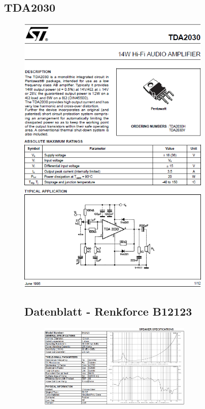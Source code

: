 \subsection{TDA2030}\label{subsec:8.3.5}
\begin{figure} [H]	
	\centering
	\includegraphics[width=0.82\textwidth]{form/tda2030first.PNG}
\end{figure}

\begin{figure}
	\subsection{Datenblatt - Renkforce B12123}\label{sec:8.7}
	\begin{figure} [H]
		\centering
		\includegraphics[width=0.8\textwidth]{img/LSMessung/TT/Renkforce-Datasheet1.png}
	\end{figure}
\end{figure}
